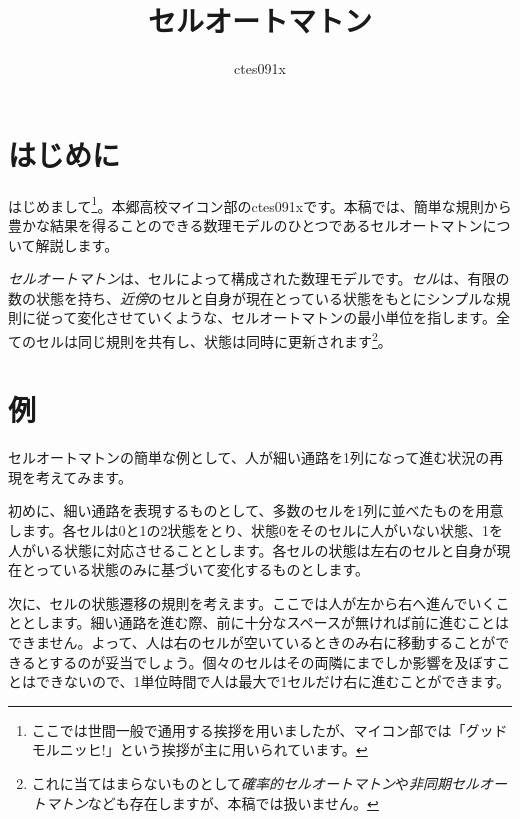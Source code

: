 \documentclass{jsarticle}
\title{セルオートマトン}
\author{ctes091x}
\begin{document}
\maketitle

\section{はじめに}
はじめまして\footnote{ここでは世間一般で通用する挨拶を用いましたが、マイコン部では「グッドモルニッヒ!」という挨拶が主に用いられています。}。本郷高校マイコン部のctes091xです。本稿では、簡単な規則から豊かな結果を得ることのできる数理モデルのひとつであるセルオートマトンについて解説します。

\emph{セルオートマトン}は、セルによって構成された数理モデルです。\emph{セル}は、有限の数の状態を持ち、\emph{近傍}のセルと自身が現在とっている状態をもとにシンプルな規則に従って変化させていくような、セルオートマトンの最小単位を指します。全てのセルは同じ規則を共有し、状態は同時に更新されます\footnote{これに当てはまらないものとして\emph{確率的セルオートマトン}や\emph{非同期セルオートマトン}なども存在しますが、本稿では扱いません。}。

\section{例}
セルオートマトンの簡単な例として、人が細い通路を1列になって進む状況の再現を考えてみます。

初めに、細い通路を表現するものとして、多数のセルを1列に並べたものを用意します。各セルは0と1の2状態をとり、状態0をそのセルに人がいない状態、1を人がいる状態に対応させることとします。各セルの状態は左右のセルと自身が現在とっている状態のみに基づいて変化するものとします。

次に、セルの状態遷移の規則を考えます。ここでは人が左から右へ進んでいくこととします。細い通路を進む際、前に十分なスペースが無ければ前に進むことはできません。よって、人は右のセルが空いているときのみ右に移動することができるとするのが妥当でしょう。個々のセルはその両隣にまでしか影響を及ぼすことはできないので、1単位時間で人は最大で1セルだけ右に進むことができます。

\end{document}
